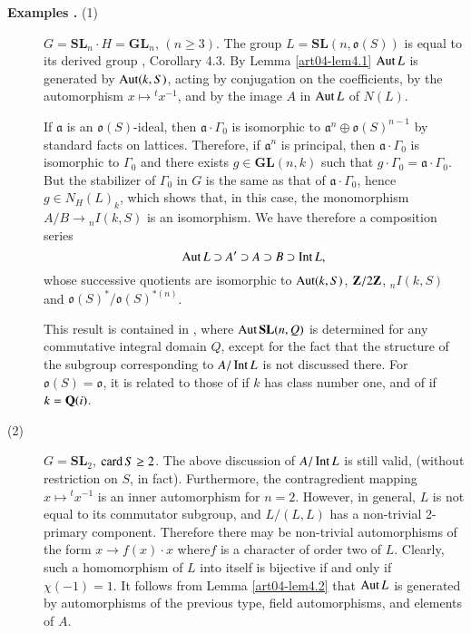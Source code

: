 \begin{description}
\item[{\bf Examples .\label{art04-exams4.6}} {\rm(1)}]
$G=\mathbf{SL}_{n}\cdot H=\mathbf{GL}_{n}$, $(n\geq 3)$. The group $L=\mathbf{SL}(n,\mathfrak{o}(S))$ is equal to its derived group \cite{art04-key3}, Corollary 4.3. By Lemma \ref{art04-lem4.1} $\operatorname{\mathrm{Aut}} L$ is generated by $\operatorname{\mathrm{Aut}} (k,S)$, acting by conjugation on the coefficients, by the automorphism $x\mapsto {}^{t}x^{-1}$, and by the image $A$ in $\operatorname{\mathrm{Aut}} L$ of $N(L)$.

If $\mathfrak{a}$ is an $\mathfrak{o}(S)$-ideal, then $\mathfrak{a}\cdot \Gamma_{0}$ is isomorphic to $\mathfrak{a}^{n}\oplus \mathfrak{o}(S)^{n-1}$ by standard facts on lattices. Therefore, if $\mathfrak{a}^{n}$ is principal, then $\mathfrak{a}\cdot \Gamma_{0}$ is isomorphic to $\Gamma_{0}$ and there exists $g\in \mathbf{GL}(n,k)$ such that $g\cdot \Gamma_{0}=\mathfrak{a}\cdot \Gamma_{0}$. But the stabilizer of $\Gamma_{0}$ in $G$ is the same as that of $\mathfrak{a}\cdot \Gamma_{0}$, hence $g\in N_{H}(L)_{k}$, which shows that, in this case, the monomorphism $A/B\to {}_{n}I(k,S)$ is an isomorphism. We have therefore a composition series
$$
\operatorname{\mathrm{Aut}} L\supset A'\supset A\supset B\supset \operatorname{\mathrm{Int}} L,
$$
whose successive quotients are isomorphic to $\operatorname{\mathrm{Aut}}(k,S)$, $\mathbf{Z}/2\mathbf{Z}$, ${}_{n}I(k,S)$ and $\mathfrak{o}(S)^{*}/\mathfrak{o}(S)^{*(n)}$.

This result is contained in \cite{art04-key24}, where $\operatorname{\mathrm{Aut}} \mathbf{SL}(n,Q)$ is determined for any commutative integral domain $Q$, except for the fact that the structure of the subgroup corresponding to $A/\operatorname{\mathrm{Int}} L$ is not discussed there. For $\mathfrak{o}(S)=\mathfrak{o}$, it is related to those of \cite{art04-key19} if $k$ has class number one, and of \cite{art04-key20} if $k=\mathbf{Q}(i)$.

\item[\rm(2)] $G=\mathbf{SL}_{2}$, $\operatorname{\mathrm{card}} S\geq 2$. The above discussion of $A/\operatorname{\mathrm{Int}} L$ is still valid, (without restriction on $S$, in fact). Furthermore, the contragredient mapping $x\mapsto {}^{t}x^{-1}$ is an inner automorphism for $n=2$. However, in general, $L$ is not equal to its commutator subgroup, and $L/(L,L)$ has a non-trivial 2-primary component. Therefore there may be non-trivial automorphisms of the form $x\to f(x)\cdot x$ where\pageoriginale $f$ is a character of order two of $L$. Clearly, such a homomorphism of $L$ into itself is bijective if and only if $\chi(-1)=1$. It follows from Lemma \ref{art04-lem4.2} that $\operatorname{\mathrm{Aut}} L$ is generated by automorphisms of the previous type, field automorphisms, and elements of $A$.


\end{description}
